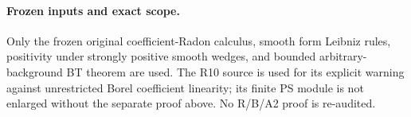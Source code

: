 \paragraph{Frozen inputs and exact scope.}
Only the frozen original coefficient-Radon calculus, smooth form
Leibniz rules, positivity under strongly positive smooth wedges,
and bounded arbitrary-background BT theorem are used. The R10
source 
is used for its explicit warning against unrestricted Borel
coefficient linearity; its finite PS module is not enlarged
without the separate proof above. No R/B/A2 proof is re-audited.
